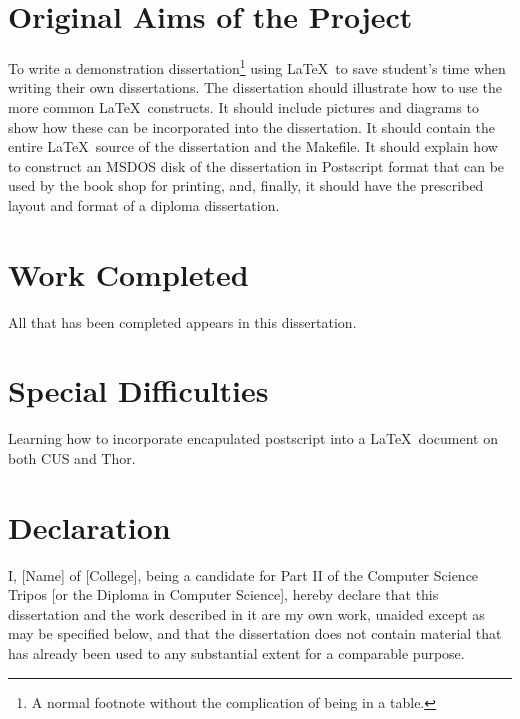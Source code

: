\documentclass[12pt,twoside,notitlepage]{report}
\begin{document}
\section*{Original Aims of the Project}

To write a demonstration dissertation\footnote{A normal footnote without the
complication of being in a table.} using \LaTeX\ to save
student's time when writing their own dissertations. The dissertation
should illustrate how to use the more common \LaTeX\ constructs. It
should include pictures and diagrams to show how these can be
incorporated into the dissertation.  It should contain the entire
\LaTeX\ source of the dissertation and the Makefile.  It should
explain how to construct an MSDOS disk of the dissertation in
Postscript format that can be used by the book shop for printing, and,
finally, it should have the prescribed layout and format of a diploma
dissertation.


\section*{Work Completed}

All that has been completed appears in this dissertation.

\section*{Special Difficulties}

Learning how to incorporate encapulated postscript into a \LaTeX\
document on both CUS and Thor.
 
\newpage
\section*{Declaration}

I, [Name] of [College], being a candidate for Part II of the Computer
Science Tripos [or the Diploma in Computer Science], hereby declare
that this dissertation and the work described in it are my own work,
unaided except as may be specified below, and that the dissertation
does not contain material that has already been used to any substantial
extent for a comparable purpose.

\bigskip
{}

\medskip
{}

\cleardoublepage

\tableofcontents

\listoffigures
\end{document}
